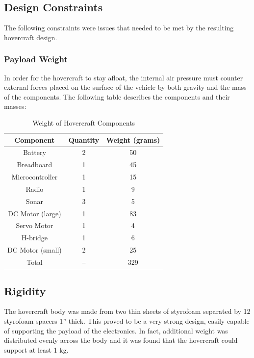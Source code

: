 \subsection{Design Constraints}
The following constraints were issues that needed to be met by the resulting hovercraft design.

\subsubsection{Payload Weight}
In order for the hovercraft to stay afloat, the internal air pressure must counter external forces placed on the surface of the vehicle by both gravity and the mass of the components. The following table describes the components and their masses:

\begin{table}
\caption{Weight of Hovercraft Components}
\begin{center}
\begin{tabular}{ c c c}
  Component & Quantity & Weight (grams) \\
  \hline
	Battery  &	2 & 	50 \\
	Breadboard &	1 &	45 \\
	Microcontroller &	1 &	15 \\
	Radio &	1 &	9 \\
	Sonar &	3 &	5 \\
	DC Motor (large) &	1 &	83 \\
	Servo Motor &	1 &	4 \\
	H-bridge &	1 &	6 \\
	DC Motor (small) &	2 &	25 \\
	Total &	-- &	329 \\
\end{tabular}
\end{center}
\label{restingTable}
\end{table}

\subsection{Rigidity}
The hovercraft body was made from two thin sheets of styrofoam separated by 12 styrofoam spacers 1'' thick. This proved to be a very strong design, easily capable of supporting the payload of the electronics. In fact, additional weight was distributed evenly across the body and it was found that the hovercraft could support at least 1 kg.

